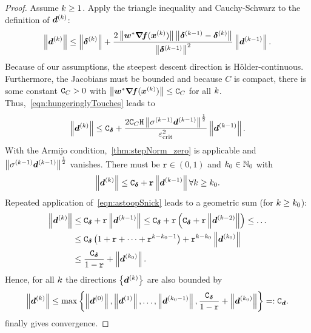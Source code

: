 \documentclass{article}
\theoremstyle{plain}
\theoremstyle{definition}
\begin{document}
\begin{proof}
Assume $k \geq 1$.
Apply the triangle inequality and Cauchy-Schwarz
to the definition of $\bm{d}^{(k)}$:
\begin{equation}
	\left\|\bm{d}^{(k)}\right\|
	\leq
	\left\|\bm{\delta}^{(k)}\right\|
	+ 
	\frac{
		2 
		\left\|\bm{w}^*\bm{\nabla}\!\bm{f}(\bm{x}^{(k)})\right\|
		\left\|\bm{\delta}^{(k-1)} - \bm{\delta}^{(k)}\right\|
	}{
		\left\|\bm{\delta}^{(k-1)}\right\|^2
	}
	\left\|\bm{d}^{(k-1)}\right\|.
	\label{eqn:hungeringlyTouches}
\end{equation}
Because of our assumptions, the steepest descent direction is Hölder-continuous.
Furthermore, the Jacobians must be bounded and because
$C$ is compact, there is some constant $\mathtt C_{C} > 0$
with $\left\|\bm{w}^*\bm{\nabla}\!\bm{f}(\bm{x}^{(k)})\right\| \leq \mathtt C_{C}$ for all $k$.
Thus,~\eqref{eqn:hungeringlyTouches} leads to
\begin{equation}
	\left\|\bm{d}^{(k)}\right\|
	\leq
	\mathtt C_{\bm{\delta}}
	+
	\frac{
		2\mathtt C_{C}
			\mathtt{H}\left\|\sigma^{(k-1)}\bm{d}^{(k-1)}\right\|^\frac{1}{2}
		}{
			\varepsilon_{\mathrm{crit}}^2
		}
	\left\|\bm{d}^{(k-1)}\right\|.
\end{equation}
With the Armijo condition,~\cref{thm:stepNorm_zero} is
applicable and $\left\|\sigma^{(k-1)} \bm{d}^{(k-1)}\right\|^\frac{1}{2}$
vanishes.
There must be $\mathtt{r}\in(0,1)$ and 
$k_0\in \mathbb N_0$ with 
\begin{equation}
	\left\|\bm{d}^{(k)}\right\|
	\leq
	\mathtt C_{\bm{\delta}}
	+ 
	\mathtt{r}
	\left\|\bm{d}^{(k-1)}\right\|
	\forall 
	k \geq k_0
	.
	\label{eqn:astoopSnick}
\end{equation}
Repeated application of~\eqref{eqn:astoopSnick}
leads to a geometric sum (for $k\ge k_0$):
\begin{align*}
	\left\|\bm{d}^{(k)}\right\|
	&\leq
	\mathtt C_{\bm{\delta}}
	+ 
	\mathtt{r}
	\left\|\bm{d}^{(k-1)}\right\|
	\leq
	\mathtt C_{\bm{\delta}}
	+ 
	\mathtt{r}
	\left( 
		\mathtt C_{\bm{\delta}}
		+ 
		\mathtt{r}
		\left\|\bm{d}^{(k-2)}\right\|
	\right)
	\leq
	\dotso
	\\
	&\leq
	\mathtt C_{\bm{\delta}}
	\left(
	1 + \mathtt{r} + \dotsm + \mathtt{r}^{k - k_0 - 1}
	\right)
	+
	\mathtt{r}^{k-k_0}
	\left\|\bm{d}^{(k_0)}\right\|
	\\
	&\leq
	\frac{\mathtt C_{\bm{\delta}}}{1-\mathtt{r}}
	+
	\left\|\bm{d}^{(k_0)}\right\|
	.
\end{align*}
Hence, for all $k$ the directions $\left\{\bm{d}^{(k)}\right\}$ are also
bounded by
$$
\left\|\bm{d}^{(k)}\right\|
\leq
\max 
\left\{
	\left\|\bm{d}^{(0)}\right\|,
	\left\|\bm{d}^{(1)}\right\|,
	\ldots,
	\left\|\bm{d}^{(k_0-1)}\right\|,
	\frac{\mathtt C_{\bm{\delta}}}{1-\mathtt{r}}
	+
	\left\|\bm{d}^{(k_0)}\right\|
\right\} =: \mathtt C_{\bm{d}}.
$$
 finally gives convergence.
\end{proof}
\end{document}
